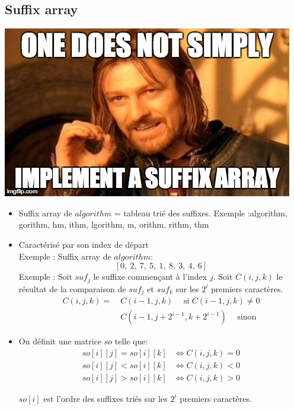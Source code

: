 \subsection{Suffix array}
\includegraphics[width=\linewidth]{suffixarray.jpg}
\begin{itemize}
\item Suffix array de $algorithm$ = tableau trié des suffixes. Exemple :algorithm, gorithm, hm, ithm, lgorithm, m, orithm, rithm, thm

\item Caractérisé par son index de départ\\
Exemple : Suffix array de $algorithm$: $$[0, \ 2, \ 7, \ 5, \ 1, \ 8, \ 3, \ 4, \ 6]$$
Exemple : Soit $suf_j$ le suffixe commençant à l'index $j$. Soit $C(i, j, k)$ le résultat de la comparaison de $suf_j$ et $suf_k$ sur les $2^i$ premiers caractères.
\begin{align*}
C(i, j, k) = & \ C(i - 1, j, k) \hspace{15pt} \text{si $C(i - 1, j, k) \neq 0$} \\
             & \ C(i - 1, j + 2^{i - 1}, k + 2^{i - 1}) \hspace{15pt} \text{sinon}
\end{align*}

\end{itemize}
\begin{itemize}

\item On définit une matrice $so$ telle que:
\begin{align*}
so[i][j] = so[i][k] & \Leftrightarrow C(i, j, k) = 0 \\
so[i][j] < so[i][k] & \Leftrightarrow C(i, j, k) < 0 \\
so[i][j] > so[i][k] & \Leftrightarrow C(i, j, k) > 0 
\end{align*}

$so[i]$ est l'ordre des suffixes triés sur les $2^i$ premiers caractères.

\end{itemize}

